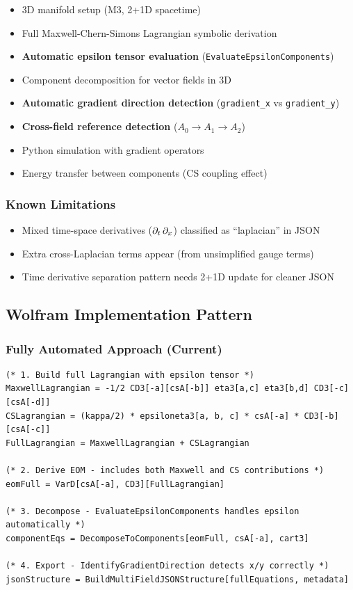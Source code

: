 \begin{itemize}
  \item 3D manifold setup (M3, 2+1D spacetime)
  \item Full Maxwell-Chern-Simons Lagrangian symbolic derivation
  \item \textbf{Automatic epsilon tensor evaluation} (\texttt{EvaluateEpsilonComponents})
  \item Component decomposition for vector fields in 3D
  \item \textbf{Automatic gradient direction detection} (\texttt{gradient\_x} vs \texttt{gradient\_y})
  \item \textbf{Cross-field reference detection} ($A_0 \to A_1 \to A_2$)
  \item Python simulation with gradient operators
  \item Energy transfer between components (CS coupling effect)
\end{itemize}

\subsubsection{Known Limitations}
\label{sec:cs-limitations}

\begin{itemize}
  \item Mixed time-space derivatives ($\partial_t\,\partial_x$) classified as ``laplacian'' in JSON
  \item Extra cross-Laplacian terms appear (from unsimplified gauge terms)
  \item Time derivative separation pattern needs 2+1D update for cleaner JSON
\end{itemize}

\subsection{Wolfram Implementation Pattern}
\label{sec:cs-wolfram}

\subsubsection{Fully Automated Approach (Current)}
\label{sec:cs-automated}

\begin{lstlisting}[style=mathematica]
(* 1. Build full Lagrangian with epsilon tensor *)
MaxwellLagrangian = -1/2 CD3[-a][csA[-b]] eta3[a,c] eta3[b,d] CD3[-c][csA[-d]]
CSLagrangian = (kappa/2) * epsiloneta3[a, b, c] * csA[-a] * CD3[-b][csA[-c]]
FullLagrangian = MaxwellLagrangian + CSLagrangian

(* 2. Derive EOM - includes both Maxwell and CS contributions *)
eomFull = VarD[csA[-a], CD3][FullLagrangian]

(* 3. Decompose - EvaluateEpsilonComponents handles epsilon automatically *)
componentEqs = DecomposeToComponents[eomFull, csA[-a], cart3]

(* 4. Export - IdentifyGradientDirection detects x/y correctly *)
jsonStructure = BuildMultiFieldJSONStructure[fullEquations, metadata]
\end{lstlisting}


